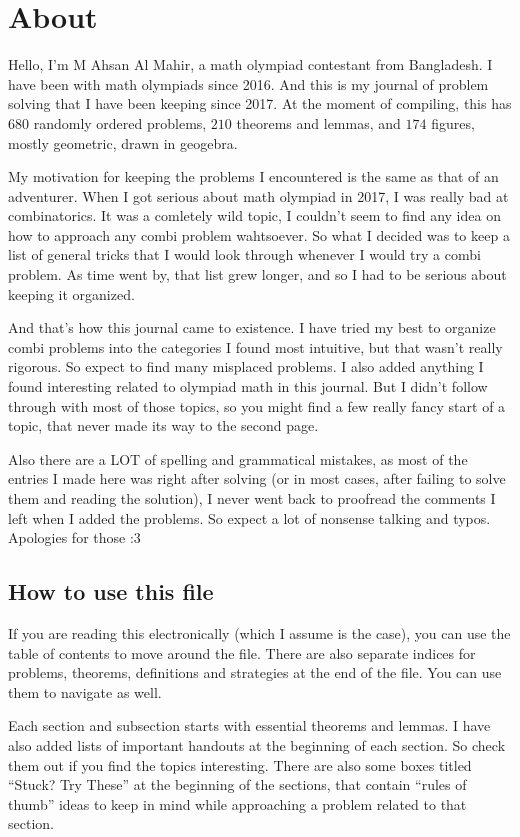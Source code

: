 \thispagestyle{empty}\section*{About}

Hello, I'm M Ahsan Al Mahir, a math olympiad contestant from Bangladesh. I
have been with math olympiads since 2016. And this is my journal of problem
solving that I have been keeping since 2017. At the moment of compiling, this
has $680$ randomly ordered problems, $210$ theorems and lemmas, and $174$
figures, mostly geometric, drawn in geogebra.

My motivation for keeping the problems I encountered is the same as that of an
adventurer. When I got serious about math olympiad in 2017, I was really bad
at combinatorics. It was a comletely wild topic, I couldn't seem to find any
idea on how to approach any combi problem wahtsoever. So what I decided was to
keep a list of general tricks that I would look through whenever I would try a
combi problem. As time went by, that list grew longer, and so I had to be
serious about keeping it organized.

And that's how this journal came to existence. I have tried my best to
organize combi problems into the categories I found most intuitive, but that
wasn't really rigorous. So expect to find many misplaced problems. I also
added anything I found interesting related to olympiad math in this journal.
But I didn't follow through with most of those topics, so you might find a few
really fancy start of a topic, that never made its way to the second page.

Also there are a LOT of spelling and grammatical mistakes, as most of the
entries I made here was right after solving (or in most cases, after failing to
solve them and reading the solution), I never went back to proofread the
comments I left when I added the problems. So expect a lot of nonsense talking
and typos. Apologies for those :3 


\subsection*{How to use this file}

If you are reading this electronically (which I assume is the case), you can
use the table of contents to move around the file. There are also separate
indices for problems, theorems, definitions and strategies at the end of the
file. You can use them to navigate as well.

Each section and subsection starts with essential theorems and lemmas. 
I have also added lists of important handouts at the beginning of each
section. So check them out if you find the topics interesting. There are
also some boxes titled ``Stuck? Try These'' at the beginning of the sections, 
that contain ``rules of thumb'' ideas to keep in mind while approaching a
problem related to that section. 


